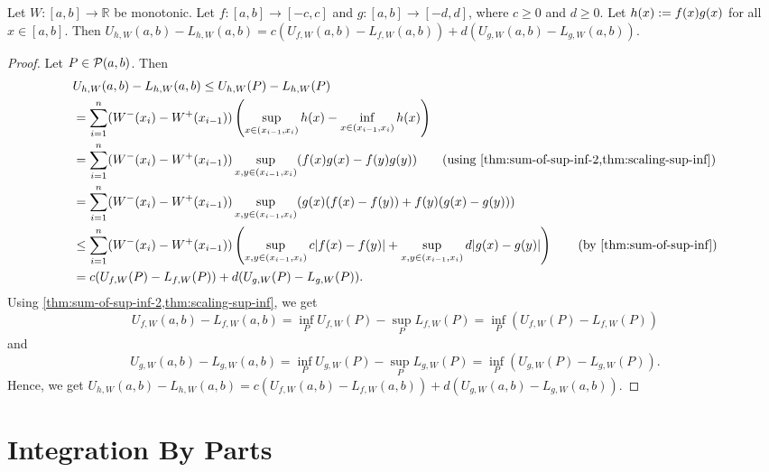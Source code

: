 \documentclass[a4paper,12pt,fleqn]{article}
\begin{document}
\begin{lemma}
\label{thm:dint:prod}
Let $W: [a, b] \to \mathbb{R}$ be monotonic.
Let $f: [a, b] \to [-c, c]$ and $g: [a, b] \to [-d, d]$,
where $c \ge 0$ and $d \ge 0$.
Let $h(x) := f(x)g(x)$ for all $x \in [a, b]$. Then
$U_{h,W}(a, b) - L_{h,W}(a, b) = c(U_{f,W}(a, b) - L_{f,W}(a, b)) + d(U_{g,W}(a, b) - L_{g,W}(a, b))$.
\end{lemma}
\begin{proof}
Let $P \in \mathcal{P}(a, b)$. Then
\begin{align*}
& U_{h,W}(a, b) - L_{h,W}(a, b) \le U_{h,W}(P) - L_{h,W}(P)
\\ &= \sum_{i=1}^n (W^-(x_i) - W^+(x_{i-1}))
    \left(\sup_{x \in (x_{i-1}, x_i)} h(x) - \inf_{x \in (x_{i-1}, x_i)} h(x)\right)
\\ &= \sum_{i=1}^n (W^-(x_i) - W^+(x_{i-1}))
    \sup_{x, y \in (x_{i-1}, x_i)} (f(x)g(x) - f(y)g(y))
    \tag{using \cref{thm:sum-of-sup-inf-2,thm:scaling-sup-inf}}
\\ &= \sum_{i=1}^n (W^-(x_i) - W^+(x_{i-1}))
    \sup_{x, y \in (x_{i-1}, x_i)} (g(x)(f(x) - f(y)) + f(y)(g(x) - g(y)))
\\ &\le \sum_{i=1}^n (W^-(x_i) - W^+(x_{i-1}))
    \left(\sup_{x, y \in (x_{i-1}, x_i)} c|f(x) - f(y)|
        + \sup_{x, y \in (x_{i-1}, x_i)} d|g(x) - g(y)|\right)
    \tag{by \cref{thm:sum-of-sup-inf}}
\\ &= c(U_{f,W}(P) - L_{f,W}(P)) + d(U_{g,W}(P) - L_{g,W}(P)).
\end{align*}
Using \cref{thm:sum-of-sup-inf-2,thm:scaling-sup-inf}, we get
\[ U_{f,W}(a, b) - L_{f,W}(a, b) = \inf_P U_{f,W}(P) - \sup_P L_{f,W}(P)
= \inf_P (U_{f,W}(P) - L_{f,W}(P)) \]
and
\[ U_{g,W}(a, b) - L_{g,W}(a, b) = \inf_P U_{g,W}(P) - \sup_P L_{g,W}(P)
= \inf_P (U_{g,W}(P) - L_{g,W}(P)). \]
Hence, we get
$U_{h,W}(a, b) - L_{h,W}(a, b) = c(U_{f,W}(a, b) - L_{f,W}(a, b)) + d(U_{g,W}(a, b) - L_{g,W}(a, b))$.
\end{proof}

\section{Integration By Parts}
\end{document}
